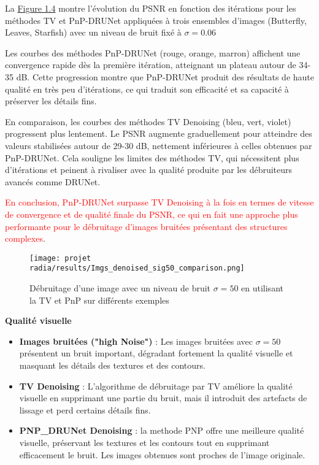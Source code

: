 \documentclass[a4paper, 12pt]{report} %
\begin{document}
La \hyperref[fig:5]{Figure 1.4} montre l’évolution du PSNR en fonction des itérations pour les méthodes TV et PnP-DRUNet appliquées à trois ensembles d’images (Butterfly, Leaves, Starfish) avec un niveau de bruit fixé à $\sigma = 0.06$

Les courbes des méthodes PnP-DRUNet (rouge, orange, marron) affichent une convergence rapide dès la première itération, atteignant un plateau autour de 34-35 dB. Cette progression montre que PnP-DRUNet produit des résultats de haute qualité en très peu d’itérations, ce qui traduit son efficacité et sa capacité à préserver les détails fins.

En comparaison, les courbes des méthodes TV Denoising (bleu, vert, violet) progressent plus lentement. Le PSNR augmente graduellement pour atteindre des valeurs stabilisées autour de 29-30 dB, nettement inférieures à celles obtenues par PnP-DRUNet. Cela souligne les limites des méthodes TV, qui nécessitent plus d’itérations et peinent à rivaliser avec la qualité produite par les débruiteurs avancés comme DRUNet.

\textcolor{red}{En conclusion, PnP-DRUNet surpasse TV Denoising à la fois en termes de vitesse de convergence et de qualité finale du PSNR, ce qui en fait une approche plus performante pour le débruitage d’images bruitées présentant des structures complexes}.


\begin{figure}[H]
    \centering
    \texttt{[image: projet radia/results/Imgs\_denoised\_sig50\_comparison.png]}
    \caption{ Débruitage d'une image avec un niveau de bruit $\sigma = 50$ en utilisant la TV et PnP  sur différents exemples }
    \label{fig:6}
\end{figure}

\textbf{Qualité visuelle}
\begin{itemize}
    \item \textbf{Images bruitées ("high Noise")} :  
    Les images bruitées avec $\sigma = 50$ présentent un bruit important, dégradant fortement la qualité visuelle et masquant les détails des textures et des contours.
    
    \item \textbf{TV Denoising} :  
    L'algorithme de débruitage par TV améliore la qualité visuelle en supprimant une partie du bruit, mais il introduit des artefacts de lissage et perd certains détails fins.
    
    \item \textbf{PNP\_DRUNet Denoising} :  
    la methode PNP offre une meilleure qualité visuelle, préservant les textures et les contours tout en supprimant efficacement le bruit. Les images obtenues sont proches de l'image originale.
\end{itemize}
\end{document}
